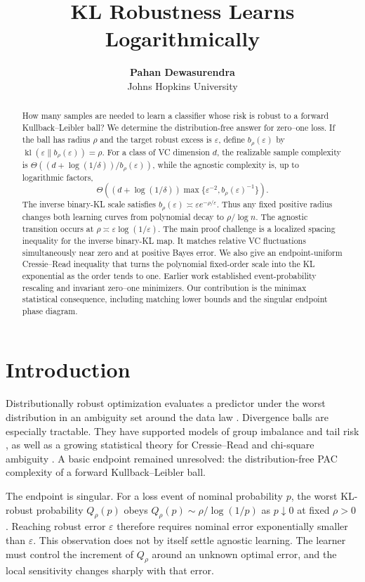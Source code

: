 \documentclass{article}
\title{KL Robustness Learns Logarithmically}
\author{\textbf{Pahan Dewasurendra} \\ Johns Hopkins University}
\theoremstyle{remark}
\newcommand{\kl}{\operatorname{kl}}
\newcommand{\eps}{\varepsilon}
\begin{document}
\maketitle

\begin{abstract}
How many samples are needed to learn a classifier whose risk is robust to a
forward Kullback--Leibler ball?  We determine the distribution-free answer for
zero--one loss.  If the ball has radius $\rho$ and the target robust excess is
$\eps$, define $b_\rho(\eps)$ by
$\kl(\eps\|b_\rho(\eps))=\rho$.  For a class of VC dimension $d$, the
realizable sample complexity is
$\Theta((d+\log(1/\delta))/b_\rho(\eps))$, while the agnostic complexity is,
up to logarithmic factors,
\[
 \Theta\!\left((d+\log(1/\delta))
 \max\{\eps^{-2},b_\rho(\eps)^{-1}\}\right).
\]
The inverse binary-KL scale satisfies
$b_\rho(\eps)\asymp\eps e^{-\rho/\eps}$.  Thus any fixed positive radius
changes both learning curves from polynomial decay to $\rho/\log n$.  The
agnostic transition occurs at
$\rho\asymp\eps\log(1/\eps)$.  The main proof challenge is a localized
spacing inequality for the inverse binary-KL map.  It matches relative VC
fluctuations simultaneously near zero and at positive Bayes error.  We also
give an endpoint-uniform Cressie--Read inequality that turns the polynomial
fixed-order scale into the KL exponential as the order tends to one.  Earlier
work established event-probability rescaling and invariant zero--one
minimizers.  Our contribution is the minimax statistical consequence,
including matching lower bounds and the singular endpoint phase diagram.
\end{abstract}

\section{Introduction}

Distributionally robust optimization evaluates a predictor under the worst
distribution in an ambiguity set around the data law
\citep{bental2013robust,duchi2021uniform}.  Divergence balls are especially
tractable.  They have supported models of group imbalance and tail risk
\citep{hashimoto2018fairness}, as well as a growing statistical theory for
Cressie--Read and chi-square ambiguity
\citep{zhou2023chisquare,zhou2026rademacher,aignerhorev2026cressie}.  A basic
endpoint remained unresolved: the distribution-free PAC complexity of a
forward Kullback--Leibler ball.

The endpoint is singular.  For a loss event of nominal probability $p$, the
worst KL-robust probability $Q_\rho(p)$ obeys
$Q_\rho(p)\sim\rho/\log(1/p)$ as $p\downarrow0$ at fixed $\rho>0$
\citep{aignerhorev2026cressie}.  Reaching robust error $\eps$ therefore
requires nominal error exponentially smaller than $\eps$.  This observation
does not by itself settle agnostic learning.  The learner must control the
increment of $Q_\rho$ around an unknown optimal error, and the local
sensitivity changes sharply with that error.
\end{document}
